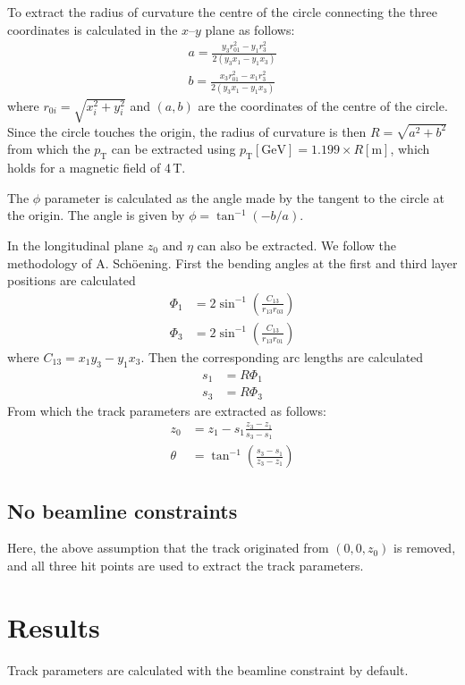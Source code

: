 \documentclass[a4paper, 12pt]{article}
\newcommand{\pt}{\ensuremath{p_{\mathrm{T}}}\xspace}
\begin{document}
To extract the radius of curvature the centre of the circle connecting the three coordinates is calculated in the $x$--$y$ plane as follows:
\begin{align}
  a = \frac{y_3 r_{01}^2 - y_1 r_3^2}{2(y_3x_1 - y_1x_3)} \\
  b = \frac{x_3 r_{01}^2 - x_1 r_3^2}{2(y_3x_1 - y_1x_3)} 
\end{align}
where $r_{0i} = \sqrt{x^2_i + y^2_i}$ and $(a, b)$ are the coordinates of the centre of the circle. 
Since the circle touches the origin, the radius of curvature is then $R=\sqrt{a^2 + b^2}$ from which the \pt can be extracted using $\pt[\mathrm{GeV}] = 1.199 \times R[\mathrm{m}]$, which holds for a
magnetic field of 4\,T.

The $\phi$ parameter is calculated as the angle made by the tangent to the circle at the origin. 
The angle is given by $\phi = \tan^{-1}( -b/a)$. 

In the longitudinal plane $z_0$ and $\eta$ can also be extracted. 
We follow the methodology of A. Sch\"oening.
First the bending angles at the first and third layer positions are calculated
\begin{align}
  \Phi_1 & = 2 \sin^{-1} \left( \frac{C_{13}}{r_{13} r_{03} }\right) \\
  \Phi_3 & = 2 \sin^{-1} \left( \frac{C_{13}}{r_{13} r_{01} }\right)
\end{align}
where $C_{13} = x_1 y_3 - y_1 x_3$.
Then the corresponding arc lengths are calculated
\begin{align}
  s_1 & = R \Phi_1 \\
  s_3 & = R \Phi_3 
\end{align}
From which the track parameters are extracted as follows:
\begin{align}
  z_0 & = z_1 - s_1 \frac{z_3 - z_1}{ s_3 - s_1} \\
  \theta & = \tan^{-1} \left( \frac{s_3 - s_1}{ z_3 - z_1} \right)
\end{align}

\subsection{No beamline constraints}
Here, the above assumption that the track originated from $(0, 0, z_0)$ is removed, and all three hit points are used to extract the track parameters. 

\section{Results} 
Track parameters are calculated with the beamline constraint by default.
\end{document}
